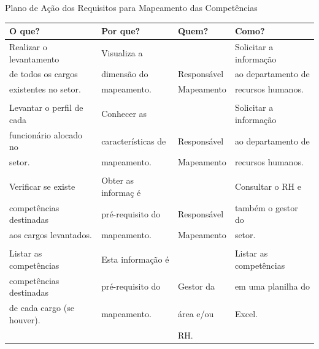 \begin{quadro}[htbp]
	\centering
	\caption{Plano de Ação dos Requisitos para Mapeamento das Competências}
	\label{tab:mapeamento_requisitos}
	\begin{tabular}{|l|l|l|l|} \hline
		O que?                  & Por que?          & Quem?                  & Como?\\
		\hline
		Realizar o levantamento & Visualiza a &                           & Solicitar a informação    \\
		de todos os cargos      & dimensão do       & Responsável & ao departamento de \\
		existentes no setor.  & mapeamento.       &     Mapeamento           & recursos humanos.\\
		               &					&                        &\\

		\hline
		Levantar o perfil de cada  & Conhecer as   &                        & Solicitar a informação    \\
		funcionário alocado no       & características de & Responsável & ao departamento de \\
		setor.  & mapeamento.       &   Mapeamento            & recursos humanos.\\
		&					&                        &\\
		\hline

		Verificar se existe  & Obter as informaç é   &                        & Consultar o RH e     \\
		competências destinadas        & pré-requisito do & Responsável & também o gestor do  \\
		aos cargos levantados.  & mapeamento.       & Mapeamento              & setor.\\
		&					&                        &\\
		\hline

		Listar as competências    & Esta informação é                         &  &Listar as competências      \\
		competências destinadas        & pré-requisito do & Gestor da & em uma planilha do   \\
		de cada cargo (se houver).  &	mapeamento.         & área e/ou               & Excel.\\
		&				&    RH.                   &\\


\end{tabular}
\end{quadro}

